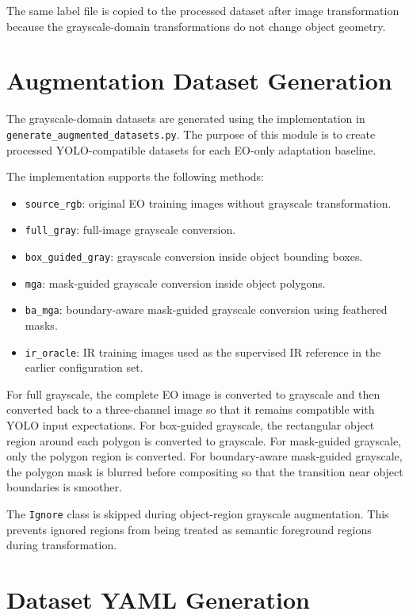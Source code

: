 The same label file is copied to the processed dataset after image transformation because the grayscale-domain transformations do not change object geometry.

\section{Augmentation Dataset Generation}

The grayscale-domain datasets are generated using the implementation in \texttt{generate\_augmented\_datasets.py}. The purpose of this module is to create processed YOLO-compatible datasets for each EO-only adaptation baseline.

The implementation supports the following methods:

\begin{itemize}
    \item \texttt{source\_rgb}: original EO training images without grayscale transformation.
    \item \texttt{full\_gray}: full-image grayscale conversion.
    \item \texttt{box\_guided\_gray}: grayscale conversion inside object bounding boxes.
    \item \texttt{mga}: mask-guided grayscale conversion inside object polygons.
    \item \texttt{ba\_mga}: boundary-aware mask-guided grayscale conversion using feathered masks.
    \item \texttt{ir\_oracle}: IR training images used as the supervised IR reference in the earlier configuration set.
\end{itemize}

For full grayscale, the complete EO image is converted to grayscale and then converted back to a three-channel image so that it remains compatible with YOLO input expectations. For box-guided grayscale, the rectangular object region around each polygon is converted to grayscale. For mask-guided grayscale, only the polygon region is converted. For boundary-aware mask-guided grayscale, the polygon mask is blurred before compositing so that the transition near object boundaries is smoother.

The \texttt{Ignore} class is skipped during object-region grayscale augmentation. This prevents ignored regions from being treated as semantic foreground regions during transformation.

\section{Dataset YAML Generation}

